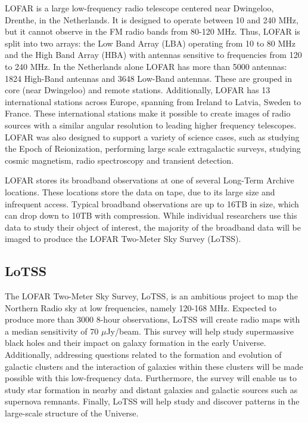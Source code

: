 \Gls{LOFAR} is a large low-frequency radio telescope centered near Dwingeloo, Drenthe, in the Netherlands\citep{vanHaarlem2013}. It is designed to operate between 10 and 240 MHz, but it cannot observe in the FM radio bands from 80-120 MHz. Thus, LOFAR is split into two arrays: the Low Band Array (LBA) operating from 10 to 80 MHz and the High Band Array (\Gls{HBA}) with antennas sensitive to frequencies from 120 to 240 MHz. In the Netherlands alone LOFAR has more than 5000 antennas: 1824 High-Band antennas and 3648 Low-Band antennas. These are grouped in core (near Dwingeloo) and remote stations\citep{LOFAR_Stations}. Additionally, LOFAR has 13 international stations across Europe, spanning from Ireland to Latvia, Sweden to France\citep{lofar_brochure_2019}. These international stations make it possible to create images of radio sources with a similar angular resolution to leading higher frequency telescopes. LOFAR was also designed to support a variety of science cases, such as studying the Epoch of Reionization\citep{patil2017upper}, performing large scale extragalactic surveys\citep{LOTSS_DR2,lotss, MSSS}, studying cosmic magnetism, radio spectroscopy\citep{oonk2017, emig2019, Arias2018, salas2018} and transient detection\citep{lofar_trans1, lofar_trans2}.

LOFAR stores its broadband observations at one of several Long-Term Archive locations. These locations store the data on tape, due to its large size and infrequent access. Typical broadband observations are up to 16TB in size, which can drop down to 10TB with compression. While individual researchers use this data to study their object of interest, the majority of the broadband data will be imaged to produce the LOFAR Two-Meter Sky Survey (LoTSS). 


\subsection{LoTSS} 

The LOFAR Two-Meter Sky Survey, \Gls{LoTSS}\citep{lotss}, is an ambitious project to map the Northern Radio sky at low frequencies, namely 120-168 MHz. Expected to produce more than 3000 8-hour observations, LoTSS will create radio maps with a median sensitivity of 70 $\mu$Jy/beam. This survey will help study supermassive black holes and their impact on galaxy formation in the early Universe. Additionally, addressing questions related to the formation and evolution of galactic clusters and the interaction of galaxies within these clusters will be made possible with this low-frequency data. Furthermore, the survey will enable us to study star formation in nearby and distant galaxies and galactic sources such as supernova remnants. Finally, LoTSS will help study and discover patterns in the large-scale structure of the Universe. 

